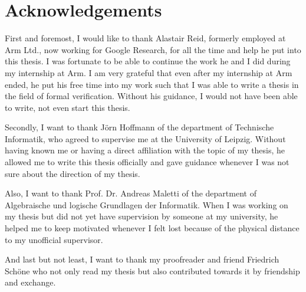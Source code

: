 \chapter*{\centering Acknowledgements}

First and foremost, I would like to thank Alastair Reid, formerly employed at Arm Ltd., now working for Google Research, for all the time and help he put into this thesis.
I was fortunate to be able to continue the work he and I did during my internship at Arm.
I am very grateful that even after my internship at Arm ended, he put his free time into my work such that I was able to write a thesis in the field of formal verification.
Without his guidance, I would not have been able to write, not even start this thesis.

Secondly, I want to thank Jörn Hoffmann of the department of Technische Informatik, who agreed to supervise me at the University of Leipzig.
Without having known me or having a direct affiliation with the topic of my thesis, he allowed me to write this thesis officially and gave guidance whenever I was not sure about the direction of my thesis.

Also, I want to thank Prof. Dr. Andreas Maletti of the department of Algebraische und logische Grundlagen der Informatik.
When I was working on my thesis but did not yet have supervision by someone at my university, he helped me to keep motivated whenever I felt lost because of the physical distance to my unofficial supervisor.

And last but not least, I want to thank my proofreader and friend Friedrich Schöne who not only read my thesis but also contributed towards it by friendship and exchange.
